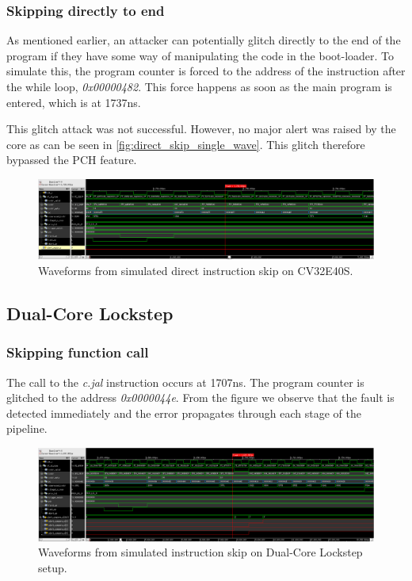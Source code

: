 \subsubsection{Skipping directly to end}

As mentioned earlier, an attacker can potentially glitch directly to the end of the program if they have some way of manipulating the code in the boot-loader. To simulate this, the program counter is forced to the address of the instruction after the while loop, \textit{0x00000482}. This force happens as soon as the main program is entered, which is at 1737ns.

This glitch attack was not successful. However, no major alert was raised by the core as can be seen in \autoref{fig:direct_skip_single_wave}. This glitch therefore bypassed the PCH feature. 

\begin{figure}[h!]
    \centering
    \includegraphics[width=\textwidth]{docs/images/direct_skip_single_core.png}
    \caption{Waveforms from simulated direct instruction skip on CV32E40S.}
    \label{fig:direct_skip_single_wave}
\end{figure}

\subsection{Dual-Core Lockstep}
\label{subsec:dual_instr_skip}

\subsubsection{Skipping function call}

The call to the \textit{c.jal} instruction occurs at 1707ns. The program counter is glitched to the address \textit{0x0000044e}. From the figure we observe that the fault is detected immediately and the error propagates through each stage of the pipeline.  

\begin{figure}[h!]
    \centering
    \includegraphics[width=\textwidth]{docs/images/instr_skip_dual_core.png}
    \caption{Waveforms from simulated instruction skip on Dual-Core Lockstep setup.}
    \label{fig:direct_skip_single_wave}
\end{figure}


